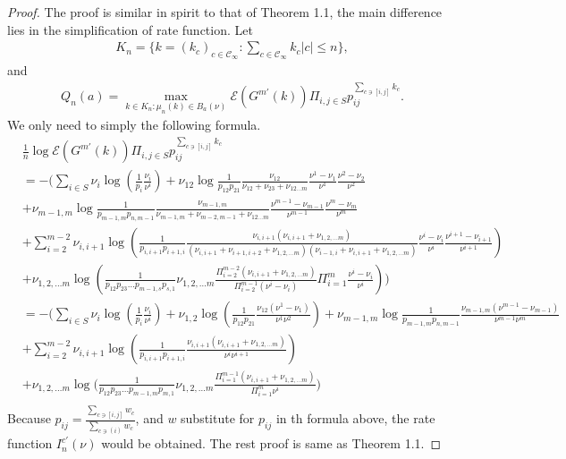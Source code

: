 \documentclass[11pt,en,cite=authoryear]{elegantpaper}
\begin{document}
\begin{proof}
    The proof is similar in spirit to that of Theorem 1.1, the main difference lies in the simplification of rate function.
    Let 
    \begin{align*}
        K_n = \biggl\{k=(k_c)_{c\in \mathcal{C}_{\infty}}: \sum_{c \in \mathcal{C}_{\infty}} k_{c} |c| \le n \biggr\},
    \end{align*}
    and
    \begin{align*}
        Q_n(a) = \max_{k\in K_n: \mu_n(k) \in B_a(\nu)} 
        \mathcal{E} (G^{m'} (k)) \Pi_{i,j \in S} p_{ij}^{\sum_{c \ni [i,j]} k_{c}}.
    \end{align*}
    We only need to simply the following formula.
    \begin{align*}
        &\frac{1}{n} \log \mathcal{E} (G^{m'} (k)) \Pi_{i, j \in S} p_{ij}^{\sum_{c \ni [i,j]} k_{c}} \\
        &= -\biggl(
        \sum_{i \in S} \nu_i \log(\frac{1}{p_{i}} \frac{\nu_i}{\nu^i})
        +\nu_{12} \log \frac{1}{p_{12}p_{21}} \frac{\nu_{12}}{\nu_{12}+\nu_{23}+\nu_{12\dots m}} \frac{\nu^1-\nu_1}{\nu^1} \frac{\nu^2 -\nu_2}{\nu^2} \\
        &+\nu_{m-1, m} \log \frac{1}{p_{m-1, m}p_{n,m-1}} \frac{\nu_{m-1, m}}{\nu_{m-1, m}+\nu_{m-2,m-1}+\nu_{12\dots m}} \frac{\nu^{m-1}-\nu_{m-1}}{\nu^{m-1}} \frac{\nu^{m} -\nu_{m}}{\nu^{m}} \\
        &+\sum_{i=2}^{m-2} \nu_{i, i+1} \log (\frac{1}{p_{i, i+1}p_{i+1, i}} 
        \frac{\nu_{i, i+1} (\nu_{i, i+1}+\nu_{1, 2, \dots m})}{(\nu_{i, i+1}+\nu_{i+1, i+2}+\nu_{1, 2, \dots m}) (\nu_{i-1, i}+\nu_{i, i+1}+\nu_{1, 2, \dots m})} 
        \frac{\nu^{i}-\nu_{i}}{\nu^{i}} \frac{\nu^{i+1}-\nu_{i+1}}{\nu^{i+1}})\\
        &+\nu_{1, 2, \dots m} \log (\frac{1}{p_{12}p_{23}\dots p_{m-1, s} p_{s,1}}
        \nu_{1, 2, \dots m} \frac{\Pi_{i=2}^{m-2} (\nu_{i, i+1} + \nu_{1, 2, \dots m})}
        {\Pi_{i=2}^{m-1} (\nu^i - \nu_i)}
        \Pi_{i=1}^{m} \frac{\nu^{i}-\nu_{i}}{\nu^{i}})
        \biggr) \\
        &= -\biggl(
        \sum_{i \in S} \nu_i \log(\frac{1}{p_{i}} \frac{\nu_i}{\nu^i})
        +\nu_{1, 2} \log (\frac{1}{p_{12}p_{21}} \frac{\nu_{12}(\nu^1-\nu_1)}{\nu^1 \nu^2}) 
        +\nu_{m-1, m} \log \frac{1}{p_{m-1, m}p_{n,m-1}} \frac{\nu_{m-1, m}(\nu^{m-1}-\nu_{m-1})}{\nu^{m-1} \nu^{m}} \\
        &+\sum_{i=2}^{m-2} \nu_{i, i+1} \log (\frac{1}{p_{i, i+1}p_{i+1, i}} 
        \frac{\nu_{i, i+1} (\nu_{i, i+1}+\nu_{1, 2, \dots m})}{\nu^{i} \nu^{i+1}} ) \\
        &+\nu_{1, 2, \dots m} \log (\frac{1}{p_{12}p_{23}\dots p_{m-1, m} p_{m,1}}
        \nu_{1, 2, \dots m} \frac{\Pi_{i=1}^{m-1} (\nu_{i, i+1} + \nu_{1, 2, \dots m})}{\Pi_{i=1}^m \nu^{i}}
        \biggr) \\
    \end{align*}
    Because $p_{ij} = \frac{\sum_{c \ni [i,j]} w_c}{\sum_{c \ni (i)} w_c}$, and $w$ substitute for $p_{ij}$ in th formula above, the rate function $I_{n}^{c'}(\nu)$ would be obtained. The rest proof is same as Theorem 1.1.
\end{proof}
\end{document}
